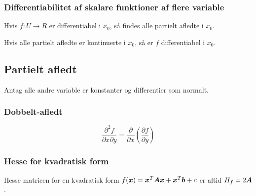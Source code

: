 \subsubsection{Differentiabilitet af skalare funktioner af flere variable}
Hvis $f: U \to R$ er differentiabel i $x_0$, så findes alle partielt afledte i $x_0$.

Hvis alle partielt afledte er kontinuerte i $x_0$, så er $f$ differentiabel i $x_0$.

\subsection{Partielt afledt}
Antag alle andre variable er konstanter og differentier som normalt.


\subsubsection{Dobbelt-afledt}

\[
    \frac{\partial^2 f}{\partial x \partial y} = \frac{\partial}{\partial x} \left( \frac{\partial f}{\partial y} \right)
\]


\subsubsection{Hesse for kvadratisk form}
Hesse matricen for en kvadratisk form $f(\boldsymbol{x}) = \boldsymbol{x}^T \boldsymbol{A} \boldsymbol{x} + \boldsymbol{x}^T \boldsymbol{b} + c$ er altid $H_f = 2 \boldsymbol{A}$.

